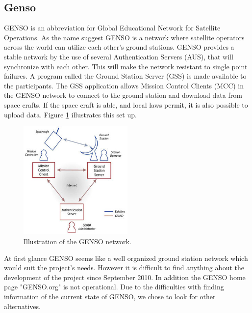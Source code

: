 \subsection{Genso}
GENSO is an abbreviation for Global Educational Network for Satellite Operations. As the name suggest GENSO is a network where satellite operators across the world can utilize each other's ground stations. GENSO provides a stable network by the use of several Authentication Servers (AUS), that will synchronize with each other. This will make the network resistant to single point failures. A program called the Ground Station Server (GSS) is made available to the participants. The GSS application allows Mission Control Clients (MCC) in the GENSO network to connect to the ground station and download data from space crafts. If the space craft is able, and local laws permit, it is also possible to upload data\cite{GENSO}. Figure \ref{GENSO_network} illustrates this set up.   

\begin{figure}
	\begin{center}
		\includegraphics[width=0.5\textwidth]{Figures/GENSO_network.jpg}
	\end{center}
	\caption{Illustration of the GENSO network.}
	\label{GENSO_network}
\end{figure}

At first glance GENSO seems like a well organized ground station network which would suit the project's needs. However it is difficult to find anything about the development of the project since September 2010. In addition the GENSO home page "GENSO.org" is not operational. Due to the difficulties with finding information of the current state of GENSO, we chose to look for other alternatives. 

